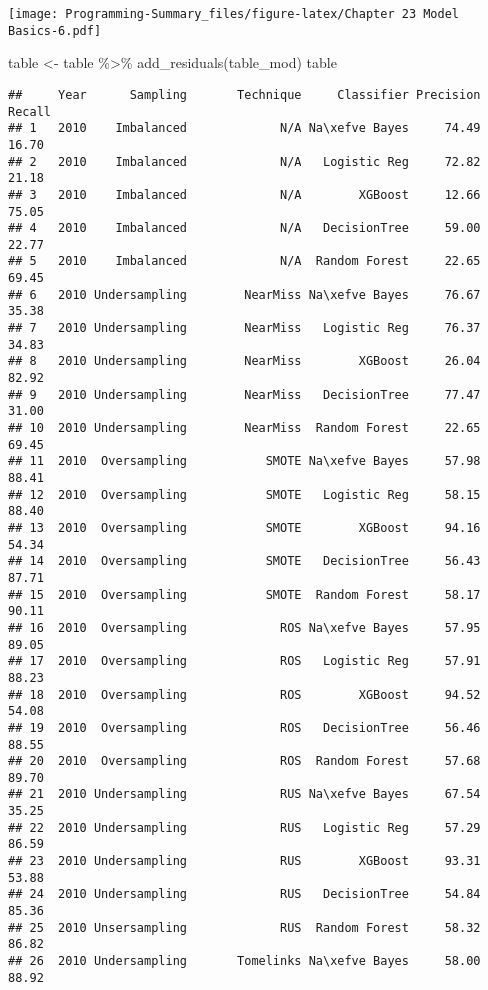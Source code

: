 \documentclass[
]{article}
\newenvironment{Shaded}{\begin{snugshade}}{\end{snugshade}}
\newcommand{\FunctionTok}[1]{\textcolor[rgb]{0.00,0.00,0.00}{#1}}
\newcommand{\NormalTok}[1]{#1}
\newcommand{\OtherTok}[1]{\textcolor[rgb]{0.56,0.35,0.01}{#1}}
\newcommand{\SpecialCharTok}[1]{\textcolor[rgb]{0.00,0.00,0.00}{#1}}
\begin{document}
\texttt{[image: Programming-Summary\_files/figure-latex/Chapter 23 Model Basics-6.pdf]}

\begin{Shaded}
\begin{Highlighting}[]
\NormalTok{table }\OtherTok{\textless{}{-}}\NormalTok{ table }\SpecialCharTok{\%\textgreater{}\%} 
  \FunctionTok{add\_residuals}\NormalTok{(table\_mod)}
\NormalTok{table}
\end{Highlighting}
\end{Shaded}

\begin{verbatim}
##     Year      Sampling       Technique     Classifier Precision Recall
## 1   2010    Imbalanced             N/A Na\xefve Bayes     74.49  16.70
## 2   2010    Imbalanced             N/A   Logistic Reg     72.82  21.18
## 3   2010    Imbalanced             N/A        XGBoost     12.66  75.05
## 4   2010    Imbalanced             N/A   DecisionTree     59.00  22.77
## 5   2010    Imbalanced             N/A  Random Forest     22.65  69.45
## 6   2010 Undersampling        NearMiss Na\xefve Bayes     76.67  35.38
## 7   2010 Undersampling        NearMiss   Logistic Reg     76.37  34.83
## 8   2010 Undersampling        NearMiss        XGBoost     26.04  82.92
## 9   2010 Undersampling        NearMiss   DecisionTree     77.47  31.00
## 10  2010 Undersampling        NearMiss  Random Forest     22.65  69.45
## 11  2010  Oversampling           SMOTE Na\xefve Bayes     57.98  88.41
## 12  2010  Oversampling           SMOTE   Logistic Reg     58.15  88.40
## 13  2010  Oversampling           SMOTE        XGBoost     94.16  54.34
## 14  2010  Oversampling           SMOTE   DecisionTree     56.43  87.71
## 15  2010  Oversampling           SMOTE  Random Forest     58.17  90.11
## 16  2010  Oversampling             ROS Na\xefve Bayes     57.95  89.05
## 17  2010  Oversampling             ROS   Logistic Reg     57.91  88.23
## 18  2010  Oversampling             ROS        XGBoost     94.52  54.08
## 19  2010  Oversampling             ROS   DecisionTree     56.46  88.55
## 20  2010  Oversampling             ROS  Random Forest     57.68  89.70
## 21  2010 Undersampling             RUS Na\xefve Bayes     67.54  35.25
## 22  2010 Undersampling             RUS   Logistic Reg     57.29  86.59
## 23  2010 Undersampling             RUS        XGBoost     93.31  53.88
## 24  2010 Undersampling             RUS   DecisionTree     54.84  85.36
## 25  2010 Unsersampling             RUS  Random Forest     58.32  86.82
## 26  2010 Undersampling       Tomelinks Na\xefve Bayes     58.00  88.92

\end{verbatim}
\end{document}

